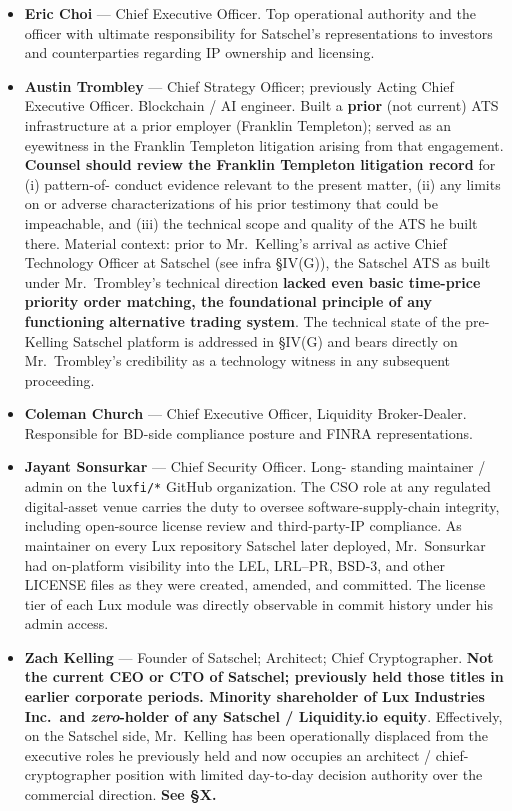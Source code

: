 \documentclass[11pt,letterpaper]{article}
\begin{document}
\begin{itemize}[leftmargin=1.5em,itemsep=0.2em]
\item \textbf{Eric Choi} --- Chief Executive Officer. Top operational
authority and the officer with ultimate responsibility for Satschel's
representations to investors and counterparties regarding IP ownership
and licensing.
\item \textbf{Austin Trombley} --- Chief Strategy Officer; previously
Acting Chief Executive Officer. Blockchain / AI engineer. Built a
\textbf{prior} (not current) ATS infrastructure at a prior employer
(Franklin Templeton); served as an eyewitness in the Franklin Templeton
litigation arising from that engagement. \textbf{Counsel should
review the Franklin Templeton litigation record} for (i) pattern-of-
conduct evidence relevant to the present matter, (ii) any limits on or
adverse characterizations of his prior testimony that could be
impeachable, and (iii) the technical scope and quality of the ATS he
built there. Material context: prior to Mr.\ Kelling's arrival as
active Chief Technology Officer at Satschel (see infra \S IV(G)),
the Satschel ATS as built under Mr.\ Trombley's technical direction
\textbf{lacked even basic time-price priority order matching, the
foundational principle of any functioning alternative trading
system}. The technical state of the pre-Kelling Satschel platform is
addressed in \S IV(G) and bears directly on Mr.\ Trombley's
credibility as a technology witness in any subsequent proceeding.
\item \textbf{Coleman Church} --- Chief Executive Officer, Liquidity
Broker-Dealer. Responsible for BD-side compliance posture and FINRA
representations.
\item \textbf{Jayant Sonsurkar} --- Chief Security Officer. Long-
standing maintainer / admin on the \texttt{luxfi/*} GitHub organization.
The CSO role at any regulated digital-asset venue carries the duty to
oversee software-supply-chain integrity, including open-source license
review and third-party-IP compliance. As maintainer on every Lux
repository Satschel later deployed, Mr.\ Sonsurkar had on-platform
visibility into the LEL, LRL--PR, BSD-3, and other LICENSE files as
they were created, amended, and committed. The license tier of each
Lux module was directly observable in commit history under his admin
access.
\item \textbf{Zach Kelling} --- Founder of Satschel; Architect; Chief
Cryptographer. \textbf{Not the current CEO or CTO of Satschel;
previously held those titles in earlier corporate periods. Minority
shareholder of Lux Industries Inc.\ and \emph{zero}-holder of any
Satschel / Liquidity.io equity}. Effectively, on the Satschel side,
Mr.\ Kelling has been operationally displaced from the executive
roles he previously held and now occupies an architect / chief-
cryptographer position with limited day-to-day decision authority over
the commercial direction. \textbf{See \S X.}
\end{itemize}
\end{document}
